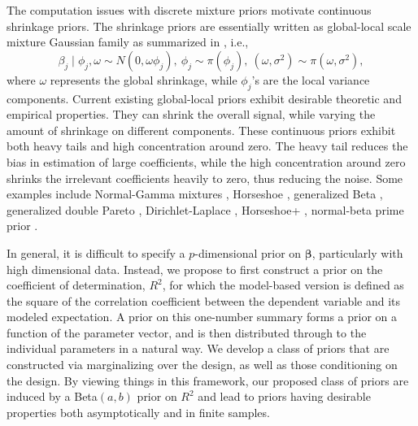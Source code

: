\documentclass[12pt]{article}
\begin{document}
The computation issues with discrete mixture priors motivate  continuous shrinkage priors. The shrinkage priors are  essentially written as global-local    scale  mixture Gaussian  family as summarized in \cite{polson2010shrink}, i.e.,
\[
\beta_j \mid \phi_j, \omega \sim N(0, \omega\phi_j), \ \phi_j\sim\pi(\phi_j), \ (\omega, \sigma^2)\sim \pi(\omega, \sigma^2),
\]
where $\omega$ represents the global shrinkage, while $\phi_j$'s are the local variance components.
Current existing global-local priors  exhibit  desirable  theoretic and  empirical  properties. They can shrink the overall signal, while varying the amount of shrinkage on different components. These continuous priors exhibit both heavy tails and high concentration around zero. The heavy tail reduces the bias in estimation of large coefficients, while the high concentration around zero shrinks the irrelevant coefficients heavily to zero, thus reducing the noise.
Some examples include
Normal-Gamma mixtures \citep{griffin2010inference},    Horseshoe    \citep{carvalho2009handling, carvalho2010horseshoe},
generalized Beta \citep{armagan2011generalized},
generalized double Pareto \citep{armagan2013generalized},
Dirichlet-Laplace   \citep{bhattacharya2015dirichlet},      Horseshoe+  \citep{bhadra2016horseshoe+}, normal-beta prime prior \citep{bai2019large}.

In general, it is difficult to specify a $p$-dimensional prior on $ \bm{\beta}$, particularly with high dimensional data. Instead, we propose to first construct a prior on the coefficient of determination, $R^2$, for which the model-based version is  defined as the square of the correlation coefficient between the dependent variable  and its modeled expectation. A prior on this one-number summary forms a prior on a function of the parameter vector, and is then distributed through to the individual parameters in a natural way. We develop a class of priors that are constructed via marginalizing over the design, as well as those conditioning on the design. By viewing things in this framework, our proposed class of priors are induced by a Beta$(a,b)$ prior on $R^2$ and lead to priors having desirable properties both asymptotically and in finite samples.
\end{document}
